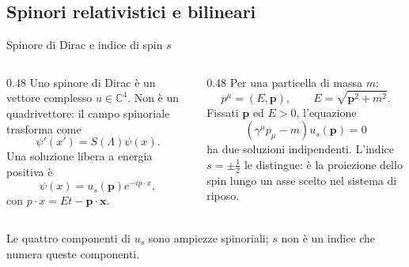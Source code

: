 \subsection{Spinori relativistici e bilineari}

\begin{frame}{Spinore di Dirac e indice di spin $s$}
\small
\begin{columns}[T,onlytextwidth]
\begin{column}{0.48\textwidth}
Uno spinore di Dirac è un vettore complesso
$u\in\mathbb C^4$. Non è un quadrivettore:
il campo spinoriale trasforma come
\[
 \psi'(x')=S(\Lambda)\psi(x).
\]
Una soluzione libera a energia positiva è
\[
 \psi(x)=u_s(\mathbf p)e^{-ip\cdot x},
\]
con $p\cdot x=Et-\mathbf p\cdot\mathbf x$.
\end{column}
\begin{column}{0.48\textwidth}
Per una particella di massa $m$:
\[
 p^\mu=(E,\mathbf p),\qquad
 E=\sqrt{\mathbf p^2+m^2}.
\]
Fissati $\mathbf p$ ed $E>0$, l'equazione
\[
 (\gamma^\mu p_\mu-m)u_s(\mathbf p)=0
\]
ha due soluzioni indipendenti.
L'indice $s=\pm\frac12$ le distingue:
è la proiezione dello spin lungo un asse
scelto nel sistema di riposo.
\end{column}
\end{columns}
\medskip
Le quattro componenti di $u_s$ sono ampiezze spinoriali;
$s$ non è un indice che numera queste componenti.
\end{frame}

